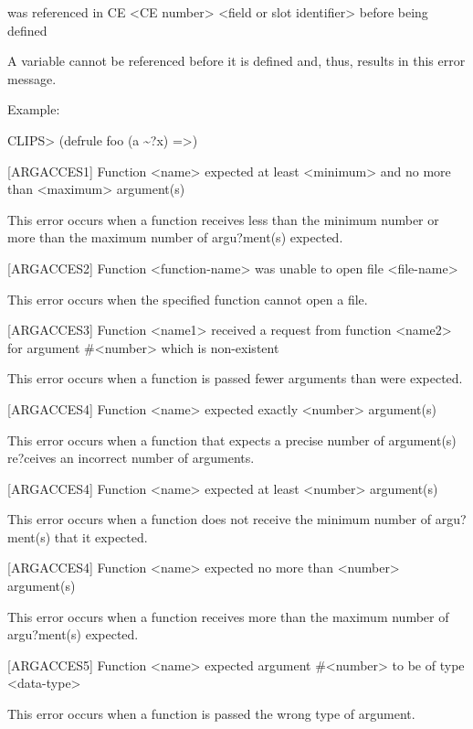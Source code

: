 \documentclass[letterpaper,10pt,english]{sphinxmanual}
\begin{document}
was referenced in CE \textless{}CE number\textgreater{} \textless{}field or slot identifier\textgreater{} before being
defined

A variable cannot be referenced before it is defined and, thus, results
in this error message.

Example:

CLIPS\textgreater{} (defrule foo (a \textasciitilde{}?x) =\textgreater{})

{[}ARGACCES1{]} Function \textless{}name\textgreater{} expected at least \textless{}minimum\textgreater{} and no more than
\textless{}maximum\textgreater{} argument(s)

This error occurs when a function receives less than the minimum number
or more than the maximum number of argu?ment(s) expected.

{[}ARGACCES2{]} Function \textless{}function-name\textgreater{} was unable to open file \textless{}file-name\textgreater{}

This error occurs when the specified function cannot open a file.

{[}ARGACCES3{]} Function \textless{}name1\textgreater{} received a request from function \textless{}name2\textgreater{}
for argument \#\textless{}number\textgreater{} which is non-existent

This error occurs when a function is passed fewer arguments than were
expected.

{[}ARGACCES4{]} Function \textless{}name\textgreater{} expected exactly \textless{}number\textgreater{} argument(s)

This error occurs when a function that expects a precise number of
argument(s) re?ceives an incorrect number of arguments.

{[}ARGACCES4{]} Function \textless{}name\textgreater{} expected at least \textless{}number\textgreater{} argument(s)

This error occurs when a function does not receive the minimum number of
argu?ment(s) that it expected.

{[}ARGACCES4{]} Function \textless{}name\textgreater{} expected no more than \textless{}number\textgreater{} argument(s)

This error occurs when a function receives more than the maximum number
of argu?ment(s) expected.

{[}ARGACCES5{]} Function \textless{}name\textgreater{} expected argument \#\textless{}number\textgreater{} to be of type
\textless{}data-type\textgreater{}

This error occurs when a function is passed the wrong type of argument.
\end{document}
